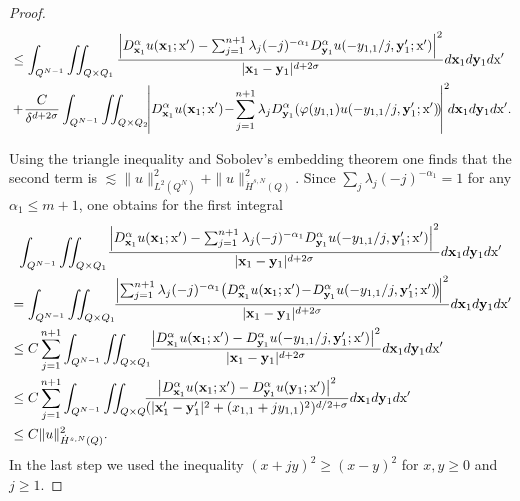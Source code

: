 \documentclass[AHL, Unicode, longabstracts, published]{cedram}
\newcommand\1{{\ensuremath {\mathds 1} }}
\newcommand{\bx}{\mathbf{x}}
\newcommand{\by}{\mathbf{y}}
\newcommand{\sx}{\textup{x}}
\begin{document}
\begin{proof}
\begin{multline*}
\begin{aligned}
&\leq
\int_{Q^{N-1}}\iint_{Q\times Q_1} \frac{\left|D^\alpha_{\bx_1} u(\bx_1;\sx')-\sum_{j=1}^{n+1}\lambda_j(-j)^{-\alpha_1} D^\alpha_{\by_1}u(-y_{1,1}/j, \by_1'; \sx')\right|^2}{|\bx_1-\by_1|^{d+2\sigma}}d\bx_1 d\by_1 d\sx'\\
&+\!\frac{C}{\delta^{d+2\sigma}}\int_{Q^{N-1}}\iint_{Q\times Q_2}\!\!\left|D^\alpha_{\bx_1} u(\bx_1;\sx')\!-\!\sum_{j=1}^{n+1}\lambda_j D^\alpha_{\by_1} (\varphi(y_{1,1}) u(-y_{1,1}/j, \by_1'; \sx')\!)\!\right|^2\!\!d\bx_1 d\by_1 d\sx'.
\end{aligned}
\end{multline*}

Using the triangle inequality and Sobolev's embedding theorem one finds that the second term is $\lesssim \|u\|_{L^2(Q^N)}^2+\|u\|_{\dot{H}^{s,N}(Q)}^2$. Since $\sum_{j}\lambda_j (-j)^{-\alpha_1} = 1$ for any\linebreak$\alpha_1\leq m+1$, one obtains for the first integral
\begin{multline*}
\int_{Q^{N-1}}\iint_{Q\times Q_1}\!\frac{\left|D^\alpha_{\bx_1} u(\bx_1;\sx')-\sum_{j=1}^{n+1}\lambda_j(-j)^{-\alpha_1} D^\alpha_{\by_1}u(-y_{1,1}/j, \by_1'; \sx')\right|^2}{|\bx_1-\by_1|^{d+2\sigma}}d\bx_1 d\by_1 d\sx'\\
\begin{aligned}
& =\int_{Q^{N-1}}\iint_{Q\times Q_1}\!\!\frac{\left|\sum_{j=1}^{n+1}\lambda_j(-j)^{-\alpha_1}\!\left(D^\alpha_{\bx_1} u(\bx_1;\sx')\!-\!D^\alpha_{\by_1}u(-y_{1,1}/j, \by_1'; \sx')\!\right)\!\right|^2}{|\bx_1-\by_1|^{d+2\sigma}}d\bx_1 d\by_1 d\sx'\\
& \leq C\sum_{j=1}^{n+1}\int_{Q^{N-1}}\iint_{Q\times Q_1}\!\!\frac{\left|D^\alpha_{\bx_1} u(\bx_1;\sx')-D^\alpha_{\by_1}u(-y_{1,1}/j, \by_1'; \sx')\right|^2}{|\bx_1-\by_1|^{d+2\sigma}}d\bx_1 d\by_1 d\sx'\\
& \leq C\sum_{j=1}^{n+1}\int_{Q^{N-1}}\iint_{Q\times Q}\!\!\frac{\left|D^\alpha_{\bx_1} u(\bx_1;\sx')-D^\alpha_{\by_1}u(\by_1; \sx')\right|^2}{(|\bx_1'-\by_1'|^2+(x_{1,1}+jy_{1,1})^2)^{d/2+\sigma}} d\bx_1 d\by_1 d\sx'\\
&\leq C \|u\|_{\dot{H}^{s,N}(Q)}^2.
\end{aligned}
\end{multline*}
In the last step we used the inequality $(x+jy)^2\geq (x-y)^2$ for $x,y\geq 0$ and $j\geq 1$.



\end{proof}
\end{document}

